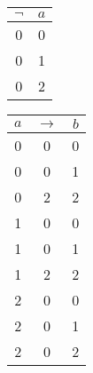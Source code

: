 \begin{center}
    \begin{tabular}{c|c}
        $\neg$ &  $a$ \\
        \hline
        0 & 0 \\
        0 & 1 \\
        0 & 2 \\
    \end{tabular}

    \begin{tabular}{c | c | c}
         $a$ &   $\to$   & $b$ \\
         \hline
          0  &   0   &  0  \\
          0  &   0   &  1  \\
          0  &   2   &  2  \\
          1  &   0   &  0  \\
          1  &   0   &  1  \\
          1  &   2   &  2  \\
          2  &   0   &  0  \\
          2  &   0   &  1  \\
          2  &   0   &  2  \\
    \end{tabular}
\end{center}

